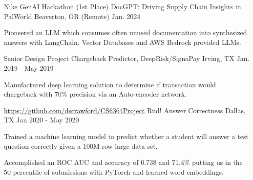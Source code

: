 


\begin{cventries}


\cventry
{Nike GenAI Hackathon} %
{(1st Place) DocGPT: Driving Supply Chain Insights in PalWorld} %
{Beaverton, OR (Remote)} %
{Jan. 2024} %
{ %
\begin{cvitems}
\item {Pioneered an LLM which consumes often unused documentation into synthesized answers with LangChain, Vector Databases and AWS Bedrock provided LLMs.}
\end{cvitems}
}


\cventry
{Senior Design Project} %
{Chargeback Predictor, DeepRisk/SignaPay} %
{Irving, TX} %
{Jan. 2019 - May 2019} %
{ %
\begin{cvitems}
\item {Manufactured deep learning solution to determine if transaction would chargeback with 70\% precision via an Auto-encoder network.}
\end{cvitems}
}

\cventry
{\url{https://github.com/dscrawford/CS6364Project}} %
{Riid! Answer Correctness} %
{Dallas, TX} %
{Jan 2020 - May 2020} %
{ %
\begin{cvitems}
\item {
Trained a machine learning model to predict whether a student will answer a test question correctly given a 100M row large data set.
}
\item { 
Accomplished an ROC AUC and accuracy of 0.738 and 71.4\% putting us in the 50 percentile of submissions with PyTorch and learned word embeddings.
}
\end{cvitems}
}


\end{cventries}
